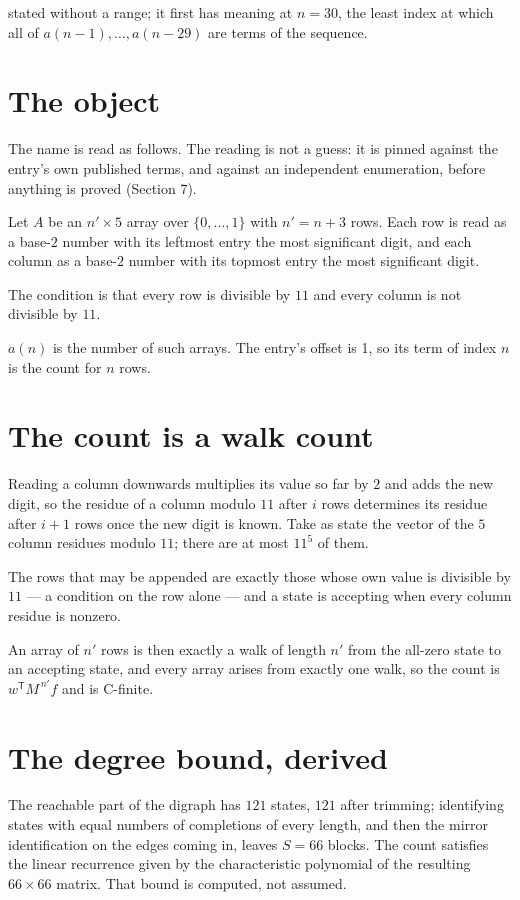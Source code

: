 \documentclass[11pt]{article}
\theoremstyle{definition}
\begin{document}
stated without a range; it first has meaning at $n = 30$, the least index at which all of $a(n-1),\dots,a(n-29)$ are terms of the sequence.

\section{The object}

The name is read as follows. The reading is not a guess: it is pinned against the entry's own published terms, and against an independent enumeration, before anything is proved (Section 7).

Let $A$ be an $n' \times 5$ array over $\{0,\dots,1\}$ with $n' = n + 3$ rows. Each row is read as a base-$2$ number with its leftmost entry the most significant digit, and each column as a base-$2$ number with its topmost entry the most significant digit.

The condition is that every row is divisible by $11$ and every column is not divisible by $11$.

$a(n)$ is the number of such arrays. The entry's offset is 1, so its term of index $n$ is the count for $n$ rows.

\section{The count is a walk count}

Reading a column downwards multiplies its value so far by $2$ and adds the new digit, so the residue of a column modulo $11$ after $i$ rows determines its residue after $i+1$ rows once the new digit is known. Take as state the vector of the $5$ column residues modulo $11$; there are at most $11^{5}$ of them.

The rows that may be appended are exactly those whose own value is divisible by $11$ --- a condition on the row alone --- and a state is accepting when every column residue is nonzero.

An array of $n'$ rows is then exactly a walk of length $n'$ from the all-zero state to an accepting state, and every array arises from exactly one walk, so the count is $w^{\mathsf T}M^{\,n'}f$ and is C-finite.

\section{The degree bound, derived}

The reachable part of the digraph has $121$ states, $121$ after trimming; identifying states with equal numbers of completions of every length, and then the mirror identification on the edges coming in, leaves $S = 66$ blocks. The count satisfies the linear recurrence given by the characteristic polynomial of the resulting $66\times66$ matrix. That bound is computed, not assumed.
\end{document}

